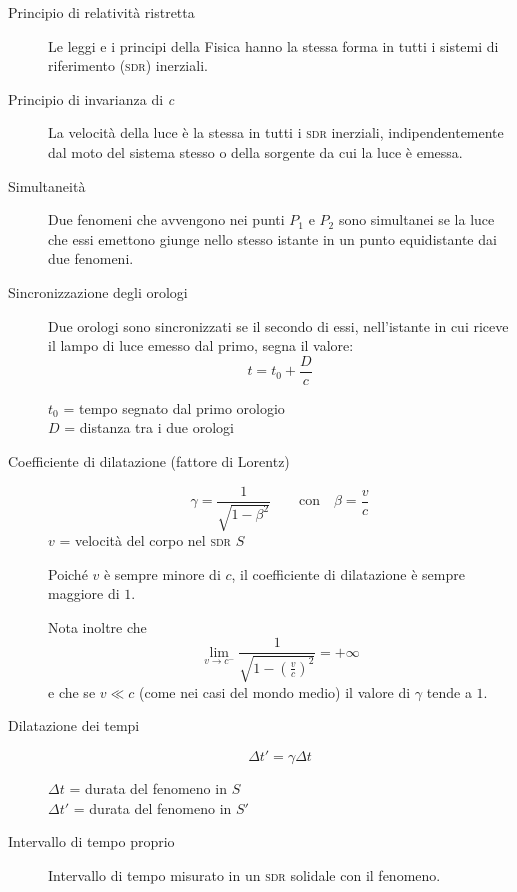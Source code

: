 \documentclass[a4paper,11pt,italian]{article}
\begin{document}
\begin{description}
  \item[Principio di relatività ristretta]
  Le leggi e i principi della Fisica hanno la stessa forma in tutti i sistemi di riferimento (\textsc{sdr}) inerziali.
  
  \item[Principio di invarianza di \textit{c}]
  La velocità della luce è la stessa in tutti i \textsc{sdr} inerziali, indipendentemente dal moto del sistema stesso o della sorgente da cui la luce è emessa.
  
  \item[Simultaneità]
  Due fenomeni che avvengono nei punti $ P_1 $ e $ P_2 $ sono simultanei se la luce che essi emettono giunge nello stesso istante in un punto equidistante dai due fenomeni.
  
  \item[Sincronizzazione degli orologi]
  Due orologi sono sincronizzati se il secondo di essi, nell'istante in cui riceve il lampo di luce emesso dal primo, segna il valore:
  \[ t = t_0 + \frac{D}{c} \]
  \begin{multicols}{2}
  $ t_0 $ = tempo segnato dal primo orologio\\
  $ D $ = distanza tra i due orologi
  \end{multicols}
  
  \item[Coefficiente di dilatazione (fattore di Lorentz)]
  \[ \gamma = \frac{1}{\sqrt{1-\beta^2}} \qquad \mathrm{con} \quad \beta = \frac{v}{c} \]
  $ v $ = velocità del corpo nel \textsc{sdr} $ S $
  
  Poiché $ v $ è sempre minore di $ c $, il coefficiente di dilatazione è sempre maggiore di $ 1 $.
  
  Nota inoltre che
  \[ \lim_{v \rightarrow c^{-}} \frac{1}{\sqrt{1-(\frac{v}{c})^2}} = + \infty \]
  e che se $ v \ll c $ (come nei casi del mondo medio) il valore di $ \gamma $ tende a $ 1 $.
  
  \item[Dilatazione dei tempi]
  \[ \Delta t' = \gamma \Delta t \]
  \begin{multicols}{2}
  $ \Delta t $ = durata del fenomeno in $ S $\\
  $ \Delta t' $ = durata del fenomeno in $ S' $
  \end{multicols}
  
  \item[Intervallo di tempo proprio]
  Intervallo di tempo misurato in un \textsc{sdr} solidale con il fenomeno.
  

\end{description}
\end{document}

